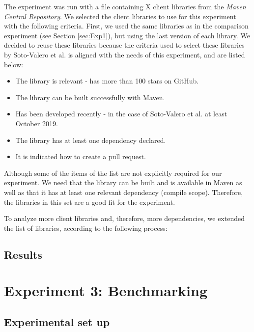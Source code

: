 \blankl
The experiment was run with a file containing X client libraries from the \textit{Maven Central Repository}.  We selected the client libraries to use for this experiment with the following criteria. First, we used the same libraries as in the comparison experiment (see Section \ref{sec:Exp1}), but using the last version of each library. We decided to reuse these libraries because the criteria used to select these libraries by Soto-Valero et al. \cite{soto2020comprehensive} is aligned with the needs of this experiment, and are listed below:

\begin{itemize}
  \item The library is relevant - has more than 100 stars on GitHub.
  \item The library can be built successfully with Maven.
  \item Has been developed recently - in the case of Soto-Valero et al. at least October 2019.
  \item The library has at least one dependency declared.
  \item It is indicated how to create a pull request.
\end{itemize}

Although some of the items of the list are not explicitly required for our experiment. We need that the library can be built and is available in Maven as well as that it has at least one relevant dependency (compile scope). Therefore, the libraries in this set are a good fit for the experiment.

To analyze more client libraries and, therefore, more dependencies, we extended the list of libraries, according to the following process:


\subsection{Results}

\section{Experiment 3: Benchmarking}

\subsection{Experimental set up}

